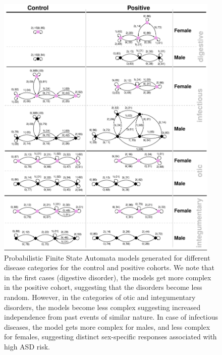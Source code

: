\documentclass[onecolumn,,10pt]{IEEEtran}
\renewcommand{\captionN}[1]{\caption{\color{black} \sffamily \fontsize{9}{10}\selectfont #1  }}
\newif\iftikzX
\gdef\treatment{positive\xspace}
\begin{document}
\begin{figure}[!t]
  \tikzexternalenable
  \centering  
  \vspace{-10pt}
  
 \def\DATA{../../data_latest}
\iftikzX

\else
  \includegraphics[width=0.95\textwidth]{Figures/External/pfsa}
  \fi
      \vspace{-5pt}

     \captionN{Probabilistic Finite State Automata models generated for different disease categories for the control and \treatment cohorts. We note that in the first  cases (digestive disorder), the models get more complex in the \treatment cohort, suggesting that the disorders become less random. However, in the categories of otic and integumentary disorders, the models become less complex suggesting increased independence from past events of similar nature. In case of infectious diseases, the model gets more complex for males, and less complex for females, suggesting distinct sex-specific responses associated with high ASD risk.}\label{EXT-autgrid}
\end{figure}
\else
{}\label{EXT-autgrid}
\fi
\end{document}
